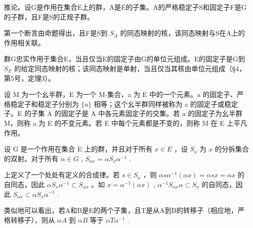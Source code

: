 推论。设G是作用在集合E上的群，A是E的子集。A的严格稳定子S和固定子F是G的子群，且F是S的正规子群。

第一个断言由命题得出，且F是S到 \(S_{A}\) 的同态映射的核，该同态映射与S在A上的作用相关联。

群G忠实作用于集合E，当且仅当E的固定子由G的单位元组成。E的固定子是G到 \(S_{E}\) 的给定同态映射的核；该同态映射是单射，当且仅当其核由单位元组成（§4，第5号，定理3）。

设 M 为一个幺半群，E 为一个 M-集合，a 为 E 中的一个元素。a 的固定子、严格稳定子和稳定子分别为 \(\{a\}\) 相等；这个幺半群同样被称为 a 的固定子或稳定子。E 的子集 A 的固定子是 A 中各元素固定子的交集。若 a 的固定子为幺半群 M，则称 a 为 E 的不变元素。若 E 中每个元素都是不变的，则称 M 在 E 上平凡作用。

设 G 是一个作用在集合 E 上的群，并且对于所有 \(x \in E\) ，设 \(S_x\) 为 \(x\) 的分拆集合的双射。对于所有 \(\alpha \in G\) , \(S_{\alpha x} = \alpha S_x \alpha^{-1}\) .

上定义了一个处处有定义的合成律。若 \(s \in S_x\) ，则 \(\alpha s \alpha^{-1}(\alpha x) = \alpha s x = \alpha x\) 的自同态，因此 \(\alpha S_x \alpha^{-1} \subset S_{\alpha x}\) 。如 \(x = \alpha^{-1}(\alpha x)\) , \(\alpha^{-1}S_{\alpha x} \alpha \subset S_x\) 的自同态，因此 \(S_{\alpha x} \subset \alpha S_x \alpha^{-1}\) .

类似地可以看出，若A和B是E的两个子集，且T是从A到B的转移子（相应地，严格转移子），则从 \(\alpha A\) 到 \(\alpha B\) 等于 \(\alpha T\alpha^{-1}\) .

